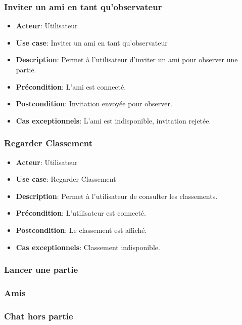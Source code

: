 \documentclass{article}
\begin{document}
\subsubsection{Inviter un ami en tant qu'observateur}
\begin{itemize}
    \item \textbf{Acteur}: Utilisateur
    \item \textbf{Use case}: Inviter un ami en tant qu'observateur
    \item \textbf{Description}: Permet à l'utilisateur d'inviter un ami pour observer une partie.
    \item \textbf{Précondition}: L'ami est connecté.
    \item \textbf{Postcondition}: Invitation envoyée pour observer.
    \item \textbf{Cas exceptionnels}: L'ami est indisponible, invitation rejetée.
\end{itemize}

\subsubsection{Regarder Classement}
\begin{itemize}
    \item \textbf{Acteur}: Utilisateur
    \item \textbf{Use case}: Regarder Classement
    \item \textbf{Description}: Permet à l'utilisateur de consulter les classements.
    \item \textbf{Précondition}: L'utilisateur est connecté.
    \item \textbf{Postcondition}: Le classement est affiché.
    \item \textbf{Cas exceptionnels}: Classement indisponible.
\end{itemize}

\subsubsection{Lancer une partie}

\subsubsection{Amis}

\subsubsection{Chat hors partie}
\end{document}

